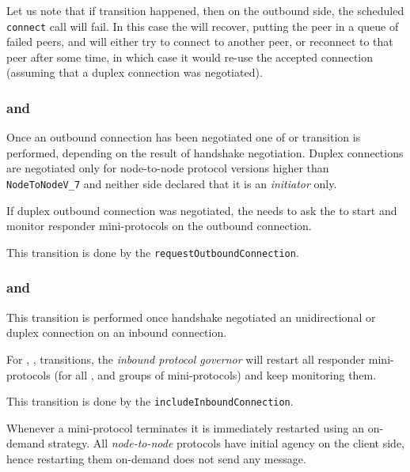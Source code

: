 Let us note that if \Overwritten{} transition happened, then on the outbound
side, the scheduled \texttt{connect} call will fail. In this case the
\ptopgov{} will recover, putting the peer in a queue of failed peers, and
will either try to connect to another peer, or reconnect to that peer after some
time, in which case it would re-use the accepted connection (assuming that
a duplex connection was negotiated).

\subsubsection{\NegotiatedUniOut{} and \NegotiatedDupOut{}}
Once an outbound connection has been negotiated one of \NegotiatedUniOut{} or
\NegotiatedDupOut{} transition is performed, depending on the result of handshake
negotiation. Duplex connections are negotiated only for node-to-node protocol
versions higher than \texttt{NodeToNodeV\_7} and neither side declared that it is an \emph{initiator} only.

If duplex outbound connection was negotiated, the \connmngr{} needs to ask the
\inbgov{} to start and monitor responder mini-protocols on the outbound
connection.

\begin{detail}
This transition is done by the \texttt{requestOutboundConnection}.
\end{detail}


\subsubsection{\NegotiatedUniIn{} and \NegotiatedDupIn{}}
This transition is performed once handshake negotiated an unidirectional or
duplex connection on an inbound connection.

For \NegotiatedUniIn{}, \NegotiatedDupIn{}, \NegotiatedDupOut{}
transitions, the \textit{inbound protocol governor} will restart all responder
mini-protocols (for all \established{}, \warm{} and \hot{} groups of
mini-protocols) and keep monitoring them.

\begin{detail}
This transition is done by the \texttt{includeInboundConnection}.
\end{detail}

\begin{detail}
  Whenever a mini-protocol terminates it is immediately restarted using
  an on-demand strategy. All \textit{node-to-node} protocols have initial agency
  on the client side, hence restarting them on-demand does not send any
  message.
\end{detail}


